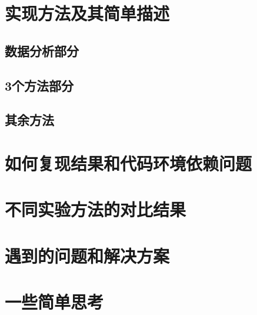 \documentclass[answers]{exam}  %
\begin{document}
\section{实现方法及其简单描述}

\subsection{数据分析部分}

\subsection{3个方法部分}

\subsection{其余方法}

\section{如何复现结果和代码环境依赖问题}

\section{不同实验方法的对比结果}

\section{遇到的问题和解决方案}

\section{一些简单思考}
\end{document}
